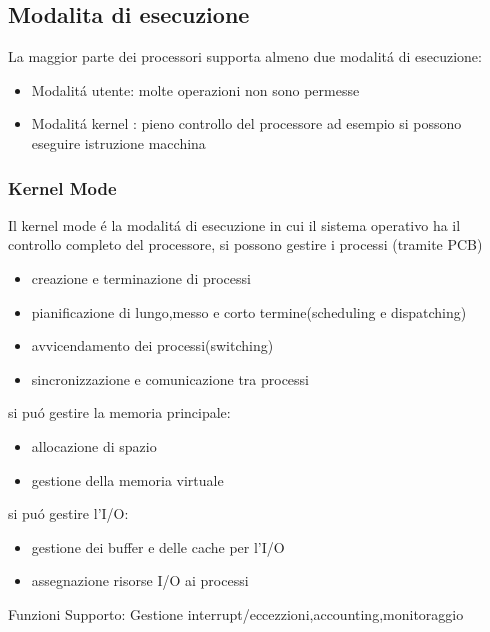 \subsection{Modalita di esecuzione}
La maggior parte dei processori supporta almeno due modalitá di esecuzione:
\begin{itemize}
    \item Modalitá utente: molte operazioni non sono permesse
    \item Modalitá kernel : pieno controllo del processore ad esempio si possono eseguire istruzione macchina
\end{itemize}
\subsubsection{Kernel Mode}
Il kernel mode é la modalitá di esecuzione in cui il sistema operativo ha il controllo completo del processore,
si possono gestire i processi (tramite PCB)
\begin{itemize}
    \item creazione e terminazione di processi
    \item pianificazione di lungo,messo e corto termine(scheduling e dispatching)
    \item avvicendamento dei processi(switching)
    \item sincronizzazione e comunicazione tra processi
\end{itemize}
si puó gestire la memoria principale:
\begin{itemize}
    \item allocazione di spazio
    \item gestione della memoria virtuale
\end{itemize}
si puó gestire l'I/O:
\begin{itemize}
    \item gestione dei buffer e delle cache per l'I/O
    \item assegnazione risorse I/O ai processi
\end{itemize}
Funzioni Supporto: Gestione interrupt/eccezzioni,accounting,monitoraggio
